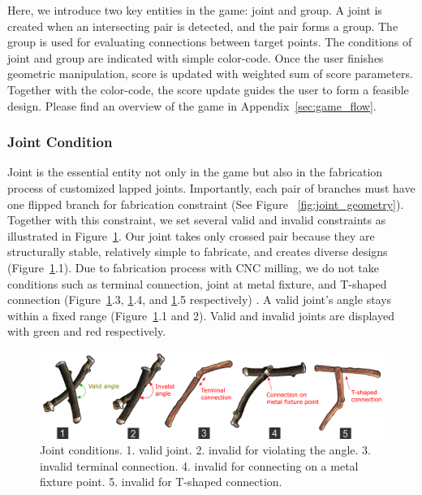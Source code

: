 Here, we introduce two key entities in the game: joint and group.
A joint is created when an intersecting pair is detected, and the pair forms a group.
The group is used for evaluating connections between target points.
The conditions of joint and group are indicated with simple color-code.
Once the user finishes geometric manipulation, score is updated with weighted sum of score parameters.
Together with the color-code, the score update guides the user to form a feasible design.
Please find an overview of the game  in Appendix~\ref{sec:game_flow}.



\subsubsection{Joint Condition}
\label{sec:joint}
Joint is the essential entity not only in the game but also in the fabrication process of customized lapped joints.
Importantly, each pair of branches must have one flipped branch for fabrication constraint (See Figure ~\ref{fig:joint_geometry}).
Together with this constraint, we set several valid and invalid constraints as illustrated in Figure~\ref{fig:joint_condition}.
Our joint takes only crossed pair because they are structurally stable, relatively simple to fabricate, and creates diverse designs (Figure~\ref{fig:joint_condition}.1).
Due to fabrication process with CNC milling, we do not take conditions such as terminal connection, joint at metal fixture, and T-shaped connection (Figure~\ref{fig:joint_condition}.3, \ref{fig:joint_condition}.4, and \ref{fig:joint_condition}.5 respectively) .
A valid joint's angle stays within a fixed range (Figure~\ref{fig:joint_condition}.1 and 2).
Valid and invalid joints are displayed with green and red respectively.

\begin{figure}[ht]
	\begin{center}
		\includegraphics[width = 0.4\paperwidth]{images/system/joint_conditions_3.png}
		\caption{Joint conditions. 1. valid joint. 2. invalid for violating the angle. 3. invalid terminal connection. 4. invalid for connecting on a metal fixture point. 5. invalid for T-shaped connection.}
		\label{fig:joint_condition}
	\end{center}
\end{figure}

